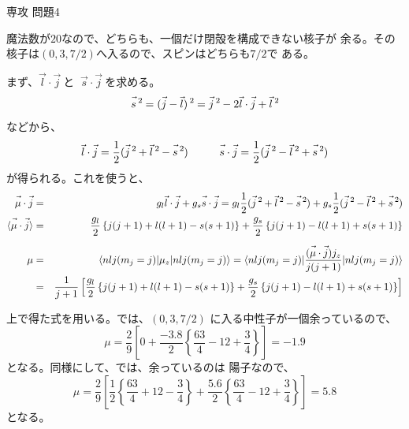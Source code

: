 \documentclass[fleqn]{jbook}
\begin{document}
\begin{answer}{専攻 問題4}{}
\begin{subanswers}
\begin{subsubanswers}
  \end{subsubanswers}


\SubAnswer
  \begin{subsubanswers}
  \SubSubAnswer
    魔法数が$20$なので、どちらも、一個だけ閉殻を構成できない核子が
    余る。その核子は$(0,3,7/2)$へ入るので、スピンはどちらも$7/2$で
    ある。

  \SubSubAnswer
    まず、$\Vec{l}\cdot\Vec{j} \ $と
    $ \ \Vec{s}\cdot\Vec{j} \ $を求める。
%
    \[ \Vec{s}\sqr = (\Vec{j}-\Vec{l})\sqr%
                   = \Vec{j}\sqr-2\Vec{l}\cdot\Vec{j}+\Vec{l}\sqr \]
%
    などから、
%
    \[ \Vec{l}\cdot\Vec{j}%
       = \frac{1}{2}(\Vec{j}\sqr+\Vec{l}\sqr-\Vec{s}\sqr )%
       \hspace{10mm}%
       \Vec{s}\cdot\Vec{j}%
       =\frac{1}{2}(\Vec{j}\sqr-\Vec{l}\sqr+\Vec{s}\sqr ) \]
%
    が得られる。これを使うと、
%
    \begin{eqnarray*}
      \Vec{\mu}\cdot\Vec{j}%
        &=& g_l \Vec{l}\cdot\Vec{j} +g_s \Vec{s}\cdot\Vec{j}%
         =  g_l\frac{1}{2}(\Vec{j}\sqr+\Vec{l}\sqr-\Vec{s}\sqr )%
           +g_s\frac{1}{2}(\Vec{j}\sqr-\Vec{l}\sqr+\Vec{s}\sqr )\\
      \Mean{\Vec{\mu}\cdot\Vec{j}}%
        &=& \frac{g_l}{2}\left\{j(j+1)+l(l+1)-s(s+1)\right\}%
           +\frac{g_s}{2}\left\{j(j+1)-l(l+1)+s(s+1)\right\} \\*[2mm]
      \mu%
        &=& \Bracket{nlj(m_j=j)}{\mu_z}{nlj(m_j=j)}%
         =  \Bracket{nlj(m_j=j)}{%
              \frac{(\Vec{\mu}\cdot\Vec{j})j_z}{j(j+1)}}%
            {nlj(m_j=j)}\\
        &=& \frac{1}{j+1}\left[\frac{g_l}{2}%
            \left\{j(j+1)+l(l+1)-s(s+1)\right\}%
           +\frac{g_s}{2}%
            \left\{j(j+1)-l(l+1)+s(s+1)\right\}\right]
    \end{eqnarray*}
%

  \SubSubAnswer
    上で得た式を用いる。\Ca では、$(0,3,7/2)$
    に入る中性子が一個余っているので、
%
    \[ \mu = \frac{2}{9}\left[0+\frac{-3.8}{2}\left\{\frac{63}{4}-12+\frac{3}{4}%
             \right\}\right] = -1.9 \]
%
    となる。同様にして、\Sc では、余っているのは
    陽子なので、
%
    \[ \mu = \frac{2}{9}\left[\frac{1}{2}\left\{\frac{63}{4}+12-\frac{3}{4}%
       \right\}+\frac{5.6}{2}\left\{\frac{63}{4}-12+\frac{3}{4}
       \right\}\right] = 5.8 \]
%
    となる。

  \end{subsubanswers}
\end{subanswers}
\end{answer}
\end{document}

